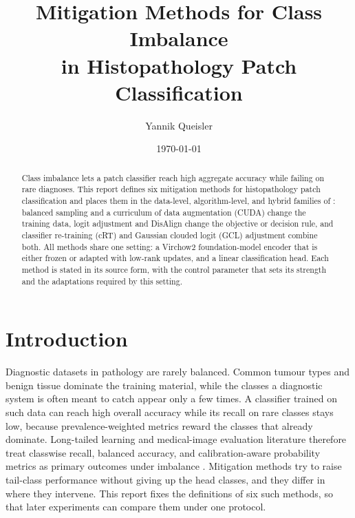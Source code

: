 \documentclass[11pt]{article}
\title{Mitigation Methods for Class Imbalance\\in Histopathology Patch Classification}
\author{Yannik Queisler}
\date{\today}
\begin{document}
\maketitle

\begin{abstract}
\noindent Class imbalance lets a patch classifier reach high aggregate accuracy while failing on rare diagnoses. This report defines six mitigation methods for histopathology patch classification and places them in the data-level, algorithm-level, and hybrid families of \citet{krawczyk2016learning}: balanced sampling and a curriculum of data augmentation (CUDA) change the training data, logit adjustment and DisAlign change the objective or decision rule, and classifier re-training (cRT) and Gaussian clouded logit (GCL) adjustment combine both. All methods share one setting: a Virchow2 foundation-model encoder that is either frozen or adapted with low-rank updates, and a linear classification head. Each method is stated in its source form, with the control parameter that sets its strength and the adaptations required by this setting.
\end{abstract}

\setcounter{tocdepth}{2}
\tableofcontents
\clearpage

\section{Introduction}
\label{sec:introduction}
Diagnostic datasets in pathology are rarely balanced. Common tumour types and benign tissue dominate the training material, while the classes a diagnostic system is often meant to catch appear only a few times. A classifier trained on such data can reach high overall accuracy while its recall on rare classes stays low, because prevalence-weighted metrics reward the classes that already dominate. Long-tailed learning and medical-image evaluation literature therefore treat classwise recall, balanced accuracy, and calibration-aware probability metrics as primary outcomes under imbalance \citep{saini2023tacklingClass,zhang2023deepLong,mosquera2024classImbalance}. Mitigation methods try to raise tail-class performance without giving up the head classes, and they differ in where they intervene. This report fixes the definitions of six such methods, so that later experiments can compare them under one protocol.
\end{document}
